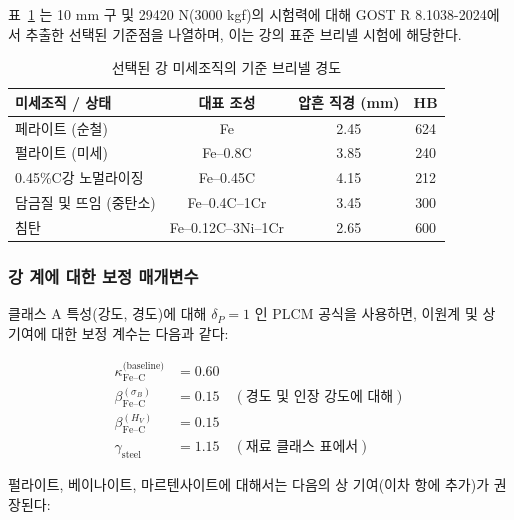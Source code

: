 \documentclass[12pt,a4paper]{article}
\begin{document}
	표~\ref{tab:steel_reference} 는 10 mm 구 및 29420 N(3000 kgf)의 시험력에 대해 GOST R 8.1038-2024에서 추출한 선택된 기준점을 나열하며, 이는 강의 표준 브리넬 시험에 해당한다.
	
	\begin{table}[htbp]
		\centering
		\caption{선택된 강 미세조직의 기준 브리넬 경도}
		\label{tab:steel_reference}
		\begin{tabular}{lccc}
			\toprule
			\textbf{미세조직 / 상태} & \textbf{대표 조성} & \textbf{압흔 직경 (mm)} & \textbf{HB} \\
			\midrule
			페라이트 (순철) & Fe & 2.45 & 624 \\
			펄라이트 (미세) & Fe–0.8C & 3.85 & 240 \\
			0.45\%C강 노멀라이징 & Fe–0.45C & 4.15 & 212 \\
			담금질 및 뜨임 (중탄소) & Fe–0.4C–1Cr & 3.45 & 300 \\
			침탄 & Fe–0.12C–3Ni–1Cr & 2.65 & 600 \\
			\bottomrule
		\end{tabular}
	\end{table}
	
	\subsubsection{강 계에 대한 보정 매개변수}
	
	클래스 A 특성(강도, 경도)에 대해 $\delta_P = 1$ 인 PLCM 공식을 사용하면, 이원계 및 상 기여에 대한 보정 계수는 다음과 같다:
	
	\begin{align*}
		\kappa_{\text{Fe–C}}^{\text{(baseline)}} &= 0.60 \\
		\beta_{\text{Fe–C}}^{(\sigma_B)} &= 0.15 \quad (\text{경도 및 인장 강도에 대해}) \\
		\beta_{\text{Fe–C}}^{(H_V)} &= 0.15 \\
		\gamma_{\text{steel}} &= 1.15 \quad (\text{재료 클래스 표에서})
	\end{align*}
	
	펄라이트, 베이나이트, 마르텐사이트에 대해서는 다음의 상 기여(이차 항에 추가)가 권장된다:
	
\end{document}

